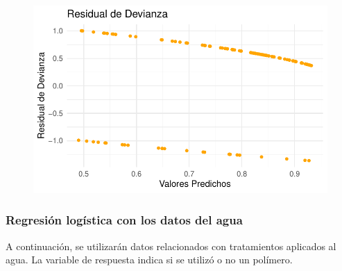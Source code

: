 \documentclass[
  letterpaper,
  DIV=11,
  numbers=noendperiod]{scrartcl}
\begin{document}
\begin{figure}
%
\begin{minipage}{0.50\linewidth}
\includegraphics{Modelos_files/figure-pdf/unnamed-chunk-48-4.pdf}\end{minipage}%

\end{figure}%

\subsubsection{Regresión logística con los datos del
agua}\label{regresiuxf3n-loguxedstica-con-los-datos-del-agua}

A continuación, se utilizarán datos relacionados con tratamientos
aplicados al agua. La variable de respuesta indica si se utilizó o no un
polímero.
\end{document}
